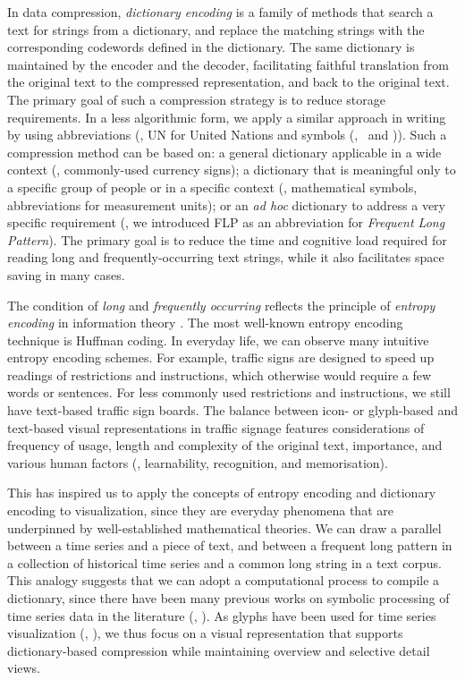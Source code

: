 In data compression, \emph{dictionary encoding} is a family of methods that search a text for strings from a dictionary, and replace the matching strings with the corresponding codewords defined in the dictionary.
The same dictionary is maintained by the encoder and the decoder, facilitating faithful translation from the original text to the compressed representation, and back to the original text. 
The primary goal of such a compression strategy is to reduce storage requirements.
In a less algorithmic form, we apply a similar approach in writing by using abbreviations (\eg, UN for United Nations and symbols (\eg, \textsection~and \textcopyright)).
Such a compression method can be based on:
a general dictionary applicable in a wide context (\eg, commonly-used currency signs);
a dictionary that is meaningful only to a specific group of people or in a specific context (\eg, mathematical symbols, abbreviations for measurement units);
or an \emph{ad hoc} dictionary to address a very specific requirement (\eg, we introduced FLP as an abbreviation for \emph{Frequent Long Pattern}).
The primary goal is to reduce the time and cognitive load required for reading long and frequently-occurring text strings, while it also facilitates space saving in many cases.

The condition of \emph{long} and \emph{frequently occurring} reflects the principle of \emph{entropy encoding} in information theory \cite{Chen10}.
The most well-known entropy encoding technique is Huffman coding.
In everyday life, we can observe many intuitive entropy encoding schemes.
For example, traffic signs are designed to speed up readings of restrictions and instructions, which otherwise would require a few words or sentences.
For less commonly used restrictions and instructions, we still have text-based traffic sign boards.
The balance between icon- or glyph-based and text-based visual representations in traffic signage features considerations of frequency of usage, length and complexity of the original text, importance, and various human factors (\eg, learnability, recognition, and memorisation).

This has inspired us to apply the concepts of entropy encoding and dictionary encoding to visualization, since they are everyday phenomena that are underpinned by well-established mathematical theories.
We can draw a parallel between a time series and a piece of text, and between a frequent long pattern in a collection of historical time series and a common long string in a text corpus.
This analogy suggests that we can adopt a computational process to compile a dictionary, since  there have been many previous works on symbolic processing of time series data in the literature (\eg, \cite{lin2005}).
As glyphs have been used for time series visualization (\eg, \cite{Saraiya2005}), we thus focus on a visual representation that supports dictionary-based compression while maintaining overview and selective detail views.


